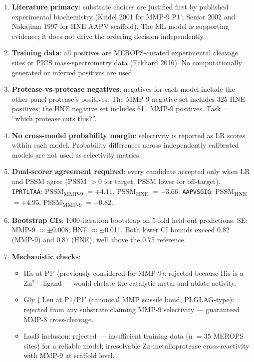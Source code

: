 \documentclass[10pt,a4paper]{article}
\newcommand{\seq}[1]{\texttt{#1}}
\begin{document}
\begin{enumerate}[leftmargin=*,label=\textbf{D\arabic*.},topsep=3pt,itemsep=3pt]

  \item \textbf{Literature primacy}: substrate choices are justified
    first by published experimental biochemistry (Kridel 2001 for
    MMP-9 P1'; Senior 2002 and Nakajima 1997 for HNE AAPV scaffold).
    The ML model is supporting evidence; it does not drive the ordering
    decision independently.

  \item \textbf{Training data}: all positives are MEROPS-curated
    experimental cleavage sites or PICS mass-spectrometry data
    (Eckhard 2016).  No computationally generated or inferred positives
    are used.

  \item \textbf{Protease-vs-protease negatives}: negatives for each model
    include the other panel protease's positives.  The MMP-9 negative
    set includes 325 HNE positives; the HNE negative set includes 611
    MMP-9 positives.  Task = ``which protease cuts this?''.

  \item \textbf{No cross-model probability margin}: selectivity is reported
    as LR scores within each model.  Probability differences across
    independently calibrated models are not used as selectivity metrics.

  \item \textbf{Dual-scorer agreement required}: every candidate accepted
    only when LR and PSSM agree (PSSM $>0$ for target, PSSM lower for
    off-target).  \seq{IPRTLTAA}: PSSM\textsubscript{MMP-9} $= +4.11$,
    PSSM\textsubscript{HNE} $= -3.66$.  \seq{AAPVSGIG}:
    PSSM\textsubscript{HNE} $= +4.95$, PSSM\textsubscript{MMP-9}
    $= -0.82$.

  \item \textbf{Bootstrap CIs}: 1000-iteration bootstrap on 5-fold
    held-out predictions.  SE: MMP-9 $\approx \pm$0.008; HNE
    $\approx \pm$0.011.  Both lower CI bounds exceed 0.82 (MMP-9)
    and 0.87 (HNE), well above the 0.75 reference.

  \item \textbf{Mechanistic checks}:
    \begin{itemize}[topsep=0pt,itemsep=0pt]
      \item His at P1' (previously considered for MMP-9): rejected
        because His is a Zn$^{2+}$ ligand --- would chelate the catalytic
        metal and ablate activity.
      \item Gly$\downarrow$Leu at P1/P1' (canonical MMP scissile bond,
        PLGLAG-type): rejected from any substrate claiming MMP-9
        selectivity --- guaranteed MMP-8 cross-cleavage.
      \item LasB inclusion: rejected --- insufficient training data
        (n $= 35$ MEROPS sites) for a reliable model; irresolvable
        Zn-metalloprotease cross-reactivity with MMP-9 at scaffold level.
    \end{itemize}


\end{enumerate}
\end{document}
